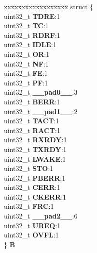 \begin{DoxyCompactItemize}
\begin{tabbing}
\end{tabbing}\item 
\mbox{\label{unionESCI__tag_1_1ESCI__SR__tag_a8a60bba4343ffc40d968a03a580b0b0e}} 
\begin{tabbing}
xx\=xx\=xx\=xx\=xx\=xx\=xx\=xx\=xx\=\kill
struct \{\\
\>uint32\_t {\bfseries TDRE}:1\\
\>uint32\_t {\bfseries TC}:1\\
\>uint32\_t {\bfseries RDRF}:1\\
\>uint32\_t {\bfseries IDLE}:1\\
\>uint32\_t {\bfseries OR}:1\\
\>uint32\_t {\bfseries NF}:1\\
\>uint32\_t {\bfseries FE}:1\\
\>uint32\_t {\bfseries PF}:1\\
\>uint32\_t {\bfseries \_\_pad0\_\_}:3\\
\>uint32\_t {\bfseries BERR}:1\\
\>uint32\_t {\bfseries \_\_pad1\_\_}:2\\
\>uint32\_t {\bfseries TACT}:1\\
\>uint32\_t {\bfseries RACT}:1\\
\>uint32\_t {\bfseries RXRDY}:1\\
\>uint32\_t {\bfseries TXRDY}:1\\
\>uint32\_t {\bfseries LWAKE}:1\\
\>uint32\_t {\bfseries STO}:1\\
\>uint32\_t {\bfseries PBERR}:1\\
\>uint32\_t {\bfseries CERR}:1\\
\>uint32\_t {\bfseries CKERR}:1\\
\>uint32\_t {\bfseries FRC}:1\\
\>uint32\_t {\bfseries \_\_pad2\_\_}:6\\
\>uint32\_t {\bfseries UREQ}:1\\
\>uint32\_t {\bfseries OVFL}:1\\
\} {\bfseries B}\\


\end{tabbing}
\end{DoxyCompactItemize}
